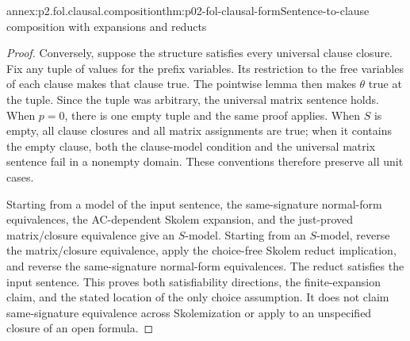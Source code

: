 \begin{annexitem}{annex:p2.fol.clausal.composition}{thm:p02-fol-clausal-form}{Sentence-to-clause composition with expansions and reducts}
\begin{proof}
Conversely, suppose the structure satisfies every universal clause
closure.  Fix any tuple of values for the prefix variables.  Its
restriction to the free variables of each clause makes that clause
true.  The pointwise lemma then makes \(\theta\) true at the
tuple.  Since the tuple was arbitrary, the universal matrix sentence
holds.  When \(p=0\), there is one empty tuple and the same proof
applies.  When \(S\) is empty, all clause closures and all matrix
assignments are true; when it contains the empty clause, both the
clause-model condition and the universal matrix sentence fail in a
nonempty domain.  These conventions therefore preserve all unit cases.

Starting from a model of the input sentence, the same-signature
normal-form equivalences, the AC-dependent Skolem expansion, and the
just-proved matrix/closure equivalence give an \(S\)-model.
Starting from an \(S\)-model, reverse the matrix/closure equivalence,
apply the choice-free Skolem reduct implication, and reverse the
same-signature normal-form equivalences.  The reduct satisfies the
input sentence.  This proves both satisfiability directions, the
finite-expansion claim, and the stated location of the only choice
assumption.  It does not claim same-signature equivalence across
Skolemization or apply to an unspecified closure of an open formula.
\end{proof}
\end{annexitem}
